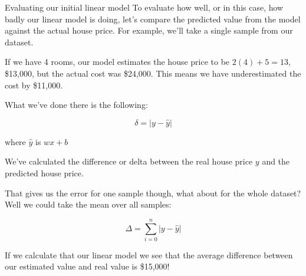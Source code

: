\documentclass[10pt]{beamer}
\begin{document}
\begin{frame}[fragile,allowframebreaks,label=]{Evaluating our initial linear model}
To evaluate how well, or in this case, how badly our linear model is doing, let's
compare the predicted value from the model against the actual house price. For
example, we'll take a single sample from our dataset.

If we have 4 rooms, our model estimates the house price to be \(2(4) + 5 = 13\),
\$13,000, but the actual cost was \$24,000. This means we have underestimated the cost
by \$11,000.

What we've done there is the following:

\[
\delta = | y - \hat{y} |
\]

where \(\hat{y}\) is \(w x + b\)

We've calculated the difference or delta between the real house price \(y\) and the
predicted house price.

That gives us the error for one sample though, what about for the whole dataset? Well
we could take the mean over all samples:

\[
\Delta = \sum_{i=0}^n | y - \hat{y} |
\]

If we calculate that our linear model we see that the average difference between our
estimated value and real value is \$15,000!
\end{frame}
\end{document}
